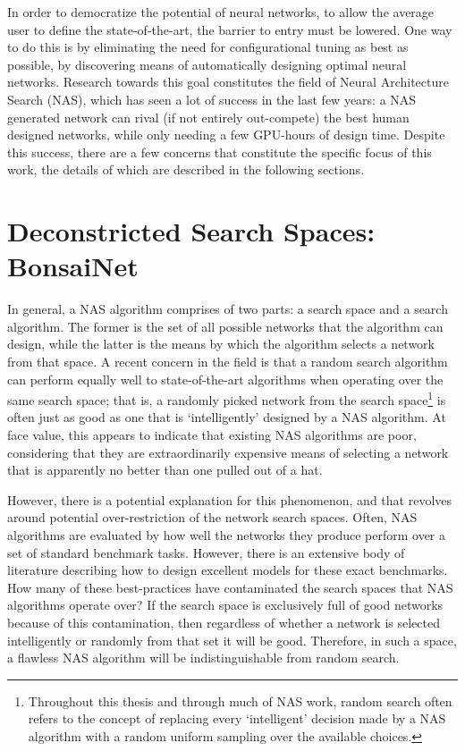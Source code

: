In order to democratize the potential of neural networks, to allow the average user to define the state-of-the-art,
the barrier to entry must be lowered. One way to do this is by eliminating the need for configurational tuning as best as possible,
by discovering means of automatically designing optimal neural networks. Research towards this goal constitutes the field
of Neural Architecture Search (NAS), which has seen a lot of success in the last few years: a NAS generated network
can rival (if not entirely out-compete) the best human designed networks, while only needing a few
GPU-hours of design time. Despite this success,
there are a few concerns that constitute the specific focus of this work, the details of which are described in the
following sections.

\section{Deconstricted Search Spaces: BonsaiNet}
In general, a NAS algorithm comprises of two parts: a search space and a search algorithm. The former is the set of
all possible networks that the algorithm can design, while the latter is the means by which the algorithm selects a network
from that space. A recent concern in the field is that a random search
algorithm can perform equally well to state-of-the-art algorithms when operating over the same search space; that is,
a randomly picked network from the search space\footnote{Throughout this thesis and through much of NAS work, random
search often refers to the concept of replacing every `intelligent' decision made by a NAS algorithm with a random uniform sampling over the available choices.} is often just as good as one that is
`intelligently' designed by a NAS algorithm. At face value, this appears to indicate that existing NAS algorithms
are poor, considering that they are extraordinarily expensive means of selecting a network that is apparently no better than one pulled out of a hat.

However, there is a potential explanation for this phenomenon, and that revolves around potential over-restriction of
the network search spaces. Often, NAS algorithms are evaluated by how well the networks they produce perform over
a set of standard benchmark tasks. However, there is an extensive body of literature describing how to design excellent
models for these exact benchmarks. How many of these best-practices have contaminated the search spaces that NAS algorithms
operate over? If the search space is exclusively full of good networks because of this contamination,
then regardless of whether a network is selected intelligently or randomly from that set it will be good. Therefore, in such
a space, a flawless NAS algorithm will be indistinguishable from random search.


